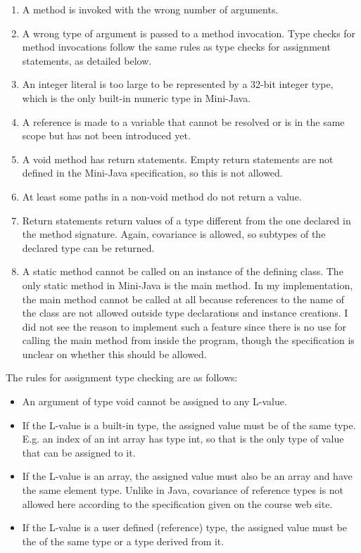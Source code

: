 \documentclass[a4paper,11pt]{article}
\begin{document}
\begin{enumerate}
\item A method is invoked with the wrong number of arguments.
\item A wrong type of argument is passed to a method invocation. Type checks for method invocations follow the same rules as type checks for assignment statements, as detailed below.
\item An integer literal is too large to be represented by a 32-bit integer type, which is the only built-in numeric type in Mini-Java.
\item A reference is made to a variable that cannot be resolved or is in the same scope but has not been introduced yet.
\item A void method has return statements. Empty return statements are not defined in the Mini-Java specification, so this is not allowed.
\item At least some paths in a non-void method do not return a value.
\item Return statements return values of a type different from the one declared in the method signature. Again, covariance is allowed, so subtypes of the declared type can be returned.
\item A static method cannot be called on an instance of the defining class. The only static method in Mini-Java is the main method. In my implementation, the main method cannot be called at all because references to the name of the class are not allowed outside type declarations and instance creations. I did not see the reason to implement such a feature since there is no use for calling the main method from inside the program, though the specification is unclear on whether this should be allowed.
\end{enumerate}

The rules for assignment type checking are as follows:
\begin{itemize}
\item An argument of type void cannot be assigned to any L-value.
\item If the L-value is a built-in type, the assigned value must be of the same type. E.g. an index of an int array has type int, so that is the only type of value that can be assigned to it.
\item If the L-value is an array, the assigned value must also be an array and have the same element type. Unlike in Java, covariance of reference types is not allowed here according to the specification given on the course web site.
\item If the L-value is a user defined (reference) type, the assigned value must be the of the same type or a type derived from it.
\end{itemize}
\end{document}
